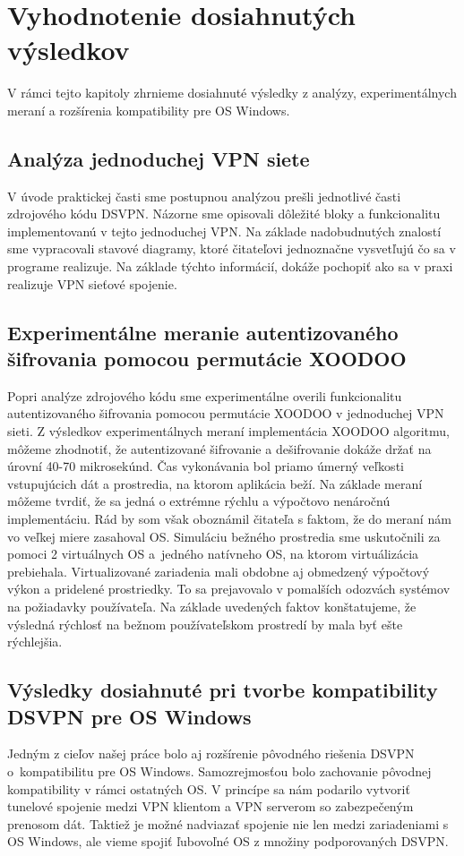 \chapter{Vyhodnotenie dosiahnutých výsledkov}
V rámci tejto kapitoly zhrnieme dosiahnuté výsledky z analýzy, experimentálnych meraní a rozšírenia kompatibility pre OS Windows.
\section{Analýza jednoduchej VPN siete}
V úvode praktickej časti sme postupnou analýzou prešli jednotlivé časti zdrojového kódu DSVPN. Názorne sme opisovali dôležité bloky a funkcionalitu implementovanú v tejto jednoduchej VPN. Na základe nadobudnutých znalostí sme vypracovali stavové diagramy, ktoré čitateľovi jednoznačne vysvetľujú čo sa v programe realizuje. Na základe týchto informácií, dokáže pochopiť ako sa v praxi realizuje VPN sieťové spojenie.
\section{Experimentálne meranie autentizovaného šifrovania pomocou permutácie XOODOO}
Popri analýze zdrojového kódu sme experimentálne overili funkcionalitu autentizovaného šifrovania pomocou permutácie XOODOO v jednoduchej VPN sieti. Z výsledkov experimentálnych meraní implementácia XOODOO algoritmu, môžeme zhodnotiť, že autentizované šifrovanie a dešifrovanie dokáže držať na úrovní 40-70 mikrosekúnd. Čas vykonávania bol priamo úmerný veľkosti vstupujúcich dát a prostredia, na ktorom aplikácia beží. Na základe meraní môžeme tvrdiť, že sa jedná o extrémne rýchlu a výpočtovo nenáročnú implementáciu. Rád by som však oboznámil čitateľa s faktom, že do meraní nám vo veľkej miere zasahoval OS. Simuláciu bežného prostredia sme uskutočnili za pomoci 2 virtuálnych OS a~jedného natívneho OS, na ktorom virtuálizácia prebiehala. Virtualizované zariadenia mali obdobne aj obmedzený výpočtový výkon a pridelené prostriedky. To sa prejavovalo v pomalších odozvách systémov na požiadavky používateľa. Na základe uvedených faktov konštatujeme, že výsledná rýchlosť na bežnom používateľskom prostredí by mala byť ešte rýchlejšia.

\section{Výsledky dosiahnuté pri tvorbe kompatibility \\DSVPN pre OS Windows}
Jedným z cieľov našej práce bolo aj rozšírenie pôvodného riešenia DSVPN o~kompatibilitu pre OS Windows. Samozrejmosťou bolo zachovanie pôvodnej kompatibility v rámci ostatných OS. V princípe sa nám podarilo vytvoriť tunelové spojenie medzi VPN klientom a VPN serverom so zabezpečeným prenosom dát. Taktiež je možné nadviazať spojenie nie len medzi zariadeniami s OS Windows, ale vieme spojiť ľubovoľné OS z množiny podporovaných DSVPN.  

